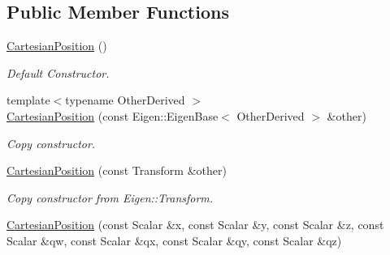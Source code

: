 \subsection*{Public Member Functions}
\begin{DoxyCompactItemize}
\item 
\hyperlink{classow__core_1_1CartesianPosition_abcb76d25934535197e2c78f66d9389aa}{Cartesian\+Position} ()\hypertarget{classow__core_1_1CartesianPosition_abcb76d25934535197e2c78f66d9389aa}{}\label{classow__core_1_1CartesianPosition_abcb76d25934535197e2c78f66d9389aa}

\begin{DoxyCompactList}\small\item\em Default Constructor. \end{DoxyCompactList}\item 
{\footnotesize template$<$typename Other\+Derived $>$ }\\\hyperlink{classow__core_1_1CartesianPosition_a27da81e6cdf3ffd4f58ee6cdbdb0b7fa}{Cartesian\+Position} (const Eigen\+::\+Eigen\+Base$<$ Other\+Derived $>$ \&other)
\begin{DoxyCompactList}\small\item\em Copy constructor. \end{DoxyCompactList}\item 
\hyperlink{classow__core_1_1CartesianPosition_a87716f0f5fd8a5ddfc1a18fb9205c4fe}{Cartesian\+Position} (const Transform \&other)
\begin{DoxyCompactList}\small\item\em Copy constructor from Eigen\+::\+Transform. \end{DoxyCompactList}\item 
\hyperlink{classow__core_1_1CartesianPosition_adab19102ef4ebb44b39c10842a550ccb}{Cartesian\+Position} (const Scalar \&x, const Scalar \&y, const Scalar \&z, const Scalar \&qw, const Scalar \&qx, const Scalar \&qy, const Scalar \&qz)\hypertarget{classow__core_1_1CartesianPosition_adab19102ef4ebb44b39c10842a550ccb}{}\label{classow__core_1_1CartesianPosition_adab19102ef4ebb44b39c10842a550ccb}


\end{DoxyCompactItemize}
